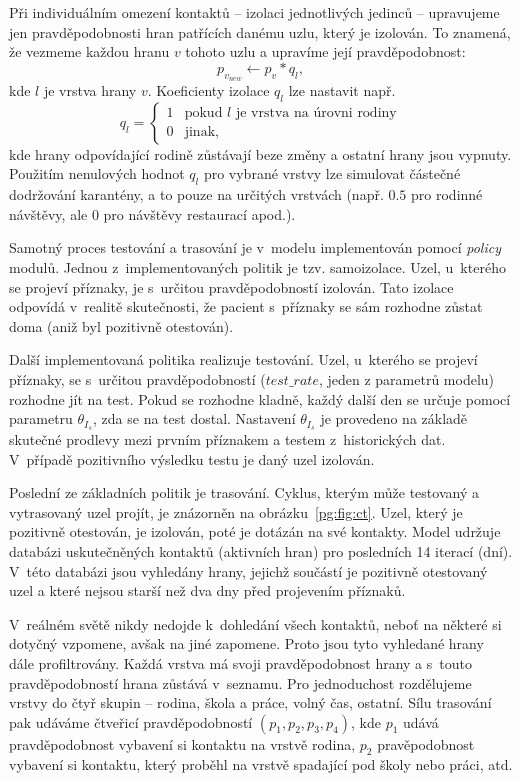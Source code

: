 Při individuálním omezení kontaktů -- izolaci jednotlivých jedinců -- upravujeme jen
pravděpodobnosti hran patřících danému uzlu, který je izolován. To znamená, že
vezmeme každou hranu $v$ tohoto uzlu a upravíme její pravděpodobnost:
$$
p_{v_{new}} \leftarrow p_{v} * q_l,
$$
kde  $l$  je vrstva hrany  $v$. 
Koeficienty izolace $q_l$ lze nastavit např.
$$
q_l =
\begin{cases}
  1  &  \mbox{pokud } l \mbox{ je vrstva na úrovni rodiny} \\
  0  &  \mbox{jinak,}
\end{cases}
$$
kde hrany odpovídající rodině zůstávají beze změny a ostatní hrany jsou vypnuty. Použitím nenulových hodnot $q_l$ pro vybrané vrstvy lze simulovat částečné dodržování karantény, a to pouze na určitých vrstvách (např. $0.5$ pro rodinné návštěvy, ale $0$ pro návštěvy restaurací apod.). 


Samotný proces testování a trasování je v~modelu implementován pomocí {\em policy} modulů. Jednou z~implementovaných politik je tzv. samoizolace. Uzel,
u~kterého se projeví příznaky, je s~určitou pravděpodobností izolován. Tato
izolace odpovídá v~realitě skutečnosti, že pacient s~příznaky se sám rozhodne
zůstat doma (aniž byl pozitivně otestován).

Další implementovaná politika realizuje testování. Uzel, u~kterého se
projeví příznaky, se s~určitou pravděpodobností ($test\_rate$, jeden z parametrů modelu)
rozhodne jít na test. Pokud se rozhodne kladně, každý další den se
určuje pomocí parametru $\theta_{I_s}$, zda se na test
dostal. Nastavení $\theta_{I_s}$ je provedeno na základě skutečné
prodlevy mezi prvním příznakem a testem z~historických dat. V~případě
pozitivního výsledku testu je daný uzel izolován.

Poslední ze základních politik je trasování. Cyklus, kterým může testovaný a
vytrasovaný uzel projít, je znázorněn na obrázku~\ref{pg:fig:ct}. Uzel, který je
pozitivně otestován, je izolován, poté je dotázán na své kontakty. Model udržuje
databázi uskutečněných kontaktů (aktivních hran) pro posledních 14 iterací (dní). V~této databázi jsou vyhledány hrany, jejichž součástí je pozitivně
otestovaný uzel a které nejsou starší než dva dny před projevením příznaků.

V~reálném světě nikdy nedojde k~dohledání všech kontaktů, neboť na některé si dotyčný vzpomene, avšak na jiné zapomene. Proto jsou tyto vyhledané hrany dále
profiltrovány. Každá vrstva má svoji pravděpodobnost  hrany a s~touto
pravděpodobností hrana zůstává v~seznamu. Pro jednoduchost rozdělujeme vrstvy
do čtyř skupin -- rodina, škola a práce, volný čas, ostatní. Sílu trasování pak
udáváme čtveřicí pravděpodobností $(p_1, p_2, p_3, p_4)$, kde 
$p_1$ udává pravděpodobnost vybavení si kontaktu na vrstvě rodina, $p_2$
pravěpodobnost vybavení si kontaktu, který proběhl na vrstvě spadající pod školy
nebo práci, atd.


